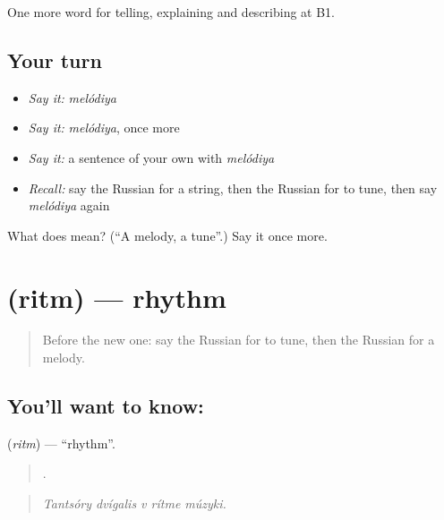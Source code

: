 \begin{grammarlens}[title={What you've built}]
One more word for telling, explaining and describing at B1.
\end{grammarlens}

\subsection*{Your turn}
\begin{itemize}
\raggedright
  \item \emph{Say it:} \emph{melódiya}
  \item \emph{Say it:} \emph{melódiya}, once more
  \item \emph{Say it:} a sentence of your own with \emph{melódiya}
  \item \emph{Recall:} say the Russian for a string, then the Russian for to tune, then say \emph{melódiya} again
\end{itemize}

\begin{tcolorbox}[breakable,colback=teal!4,colframe=teal!35!black,title={Before you move on}]
What does  mean? (\textquotedblleft{}A melody, a tune\textquotedblright{}.) Say it once more.
\end{tcolorbox}
\section[\texorpdfstring{\ru{ритм} (ritm)}{ритм (ritm)}]{ (ritm) — rhythm}

\label{lesson:RU-C516-ritm}



\begin{quote}
Before the new one: say the Russian for to tune, then the Russian for a melody.
\end{quote}

\subsection*{You'll want to know: }
\textbf{} (\emph{ritm}) — \textquotedblleft{}rhythm\textquotedblright{}.

\begin{quote}
    .
\end{quote}

\begin{quote}
\emph{Tantsóry dvígalis v rítme múzyki.}
\end{quote}

